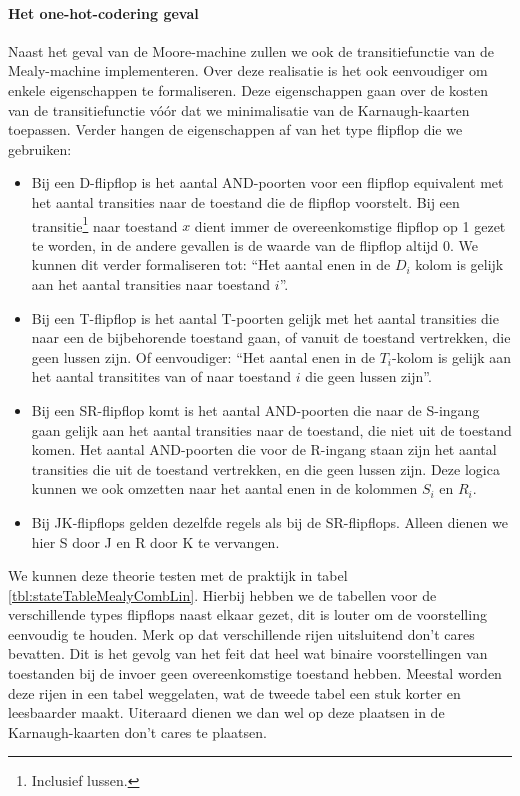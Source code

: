 \paragraph{Het one-hot-codering geval}Naast het geval van de Moore-machine zullen we ook de transitiefunctie van de Mealy-machine implementeren. Over deze realisatie is het ook eenvoudiger om enkele eigenschappen te formaliseren. Deze eigenschappen gaan over de kosten van de transitiefunctie v\'o\'or dat we minimalisatie van de Karnaugh-kaarten toepassen. Verder hangen de eigenschappen af van het type flipflop die we gebruiken:
\begin{itemize}
 \item Bij een D-flipflop is het aantal AND-poorten voor een flipflop equivalent met het aantal transities naar de toestand die de flipflop voorstelt. Bij een transitie\footnote{Inclusief lussen.} naar toestand $x$ dient immer de overeenkomstige flipflop op 1 gezet te worden, in de andere gevallen is de waarde van de flipflop altijd 0. We kunnen dit verder formaliseren tot: ``Het aantal enen in de $D_i$ kolom is gelijk aan het aantal transities naar toestand $i$''.
 \item Bij een T-flipflop is het aantal T-poorten gelijk met het aantal transities die naar een de bijbehorende toestand gaan, of vanuit de toestand vertrekken, die geen lussen zijn. Of eenvoudiger: ``Het aantal enen in de $T_i$-kolom is gelijk aan het aantal transitites van of naar toestand $i$ die geen lussen zijn''.
 \item Bij een SR-flipflop komt is het aantal AND-poorten die naar de S-ingang gaan gelijk aan het aantal transities naar de toestand, die niet uit de toestand komen. Het aantal AND-poorten die voor de R-ingang staan zijn het aantal transities die uit de toestand vertrekken, en die geen lussen zijn. Deze logica kunnen we ook omzetten naar het aantal enen in de kolommen $S_i$ en $R_i$.
 \item Bij JK-flipflops gelden dezelfde regels als bij de SR-flipflops. Alleen dienen we hier S door J en R door K te vervangen.
\end{itemize}
We kunnen deze theorie testen met de praktijk in tabel \ref{tbl:stateTableMealyCombLin}. Hierbij hebben we de tabellen voor de verschillende types flipflops naast elkaar gezet, dit is louter om de voorstelling eenvoudig te houden. Merk op dat verschillende rijen uitsluitend don't cares bevatten. Dit is het gevolg van het feit dat heel wat binaire voorstellingen van toestanden bij de invoer geen overeenkomstige toestand hebben. Meestal worden deze rijen in een tabel weggelaten, wat de tweede tabel een stuk korter en leesbaarder maakt. Uiteraard dienen we dan wel op deze plaatsen in de Karnaugh-kaarten don't cares te plaatsen.
